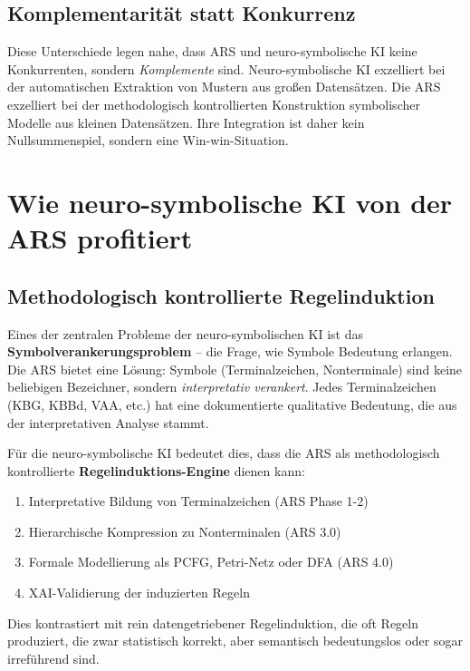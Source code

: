 \documentclass[12pt,a4paper]{article}
\begin{document}
\subsection{Komplementarität statt Konkurrenz}

Diese Unterschiede legen nahe, dass ARS und neuro-symbolische KI keine Konkurrenten, 
sondern \textit{Komplemente} sind. Neuro-symbolische KI exzelliert bei der automatischen 
Extraktion von Mustern aus großen Datensätzen. Die ARS exzelliert bei der methodologisch 
kontrollierten Konstruktion symbolischer Modelle aus kleinen Datensätzen. Ihre 
Integration ist daher kein Nullsummenspiel, sondern eine Win-win-Situation.

\section{Wie neuro-symbolische KI von der ARS profitiert}

\subsection{Methodologisch kontrollierte Regelinduktion}

Eines der zentralen Probleme der neuro-symbolischen KI ist das \textbf{Symbolverankerungsproblem} 
– die Frage, wie Symbole Bedeutung erlangen. Die ARS bietet eine Lösung: Symbole 
(Terminalzeichen, Nonterminale) sind keine beliebigen Bezeichner, sondern 
\textit{interpretativ verankert}. Jedes Terminalzeichen (KBG, KBBd, VAA, etc.) 
hat eine dokumentierte qualitative Bedeutung, die aus der interpretativen Analyse 
stammt.

Für die neuro-symbolische KI bedeutet dies, dass die ARS als methodologisch 
kontrollierte \textbf{Regelinduktions-Engine} dienen kann:

\begin{enumerate}
    \item Interpretative Bildung von Terminalzeichen (ARS Phase 1-2)
    \item Hierarchische Kompression zu Nonterminalen (ARS 3.0)
    \item Formale Modellierung als PCFG, Petri-Netz oder DFA (ARS 4.0)
    \item XAI-Validierung der induzierten Regeln
\end{enumerate}

Dies kontrastiert mit rein datengetriebener Regelinduktion, die oft Regeln 
produziert, die zwar statistisch korrekt, aber semantisch bedeutungslos oder 
sogar irreführend sind.
\end{document}
